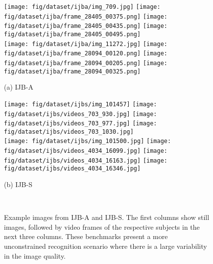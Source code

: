 \documentclass[10pt,twocolumn,letterpaper]{article}
\begin{document}
\begin{figure}
    \centering
    \footnotesize
    \captionsetup{font=footnotesize}
    \newcommand{\vshrink}{\vspace{-10px}}
    \begin{minipage}{0.48\linewidth}
    \texttt{[image: fig/dataset/ijba/img\_709.jpg]}\hfill
    \texttt{[image: fig/dataset/ijba/frame\_28405\_00375.png]}\hfill
    \texttt{[image: fig/dataset/ijba/frame\_28405\_00435.png]}\hfill
    \texttt{[image: fig/dataset/ijba/frame\_28405\_00495.png]}\\
    \texttt{[image: fig/dataset/ijba/img\_11272.jpg]}\hfill
    \texttt{[image: fig/dataset/ijba/frame\_28094\_00120.png]}\hfill
    \texttt{[image: fig/dataset/ijba/frame\_28094\_00205.png]}\hfill
    \texttt{[image: fig/dataset/ijba/frame\_28094\_00325.png]}
    \vspace{-2.0em}\begin{center}(a) IJB-A~\cite{IJBA}\end{center}
    \end{minipage}\hfill
    \begin{minipage}{0.48\linewidth}
    \texttt{[image: fig/dataset/ijbs/img\_101457]}\hfill
    \texttt{[image: fig/dataset/ijbs/videos\_703\_930.jpg]}\hfill
    \texttt{[image: fig/dataset/ijbs/videos\_703\_977.jpg]}\hfill
    \texttt{[image: fig/dataset/ijbs/videos\_703\_1030.jpg]}\\
    \texttt{[image: fig/dataset/ijbs/img\_101500.jpg]}\hfill
    \texttt{[image: fig/dataset/ijbs/videos\_4034\_16099.jpg]}\hfill
    \texttt{[image: fig/dataset/ijbs/videos\_4034\_16163.jpg]}\hfill
    \texttt{[image: fig/dataset/ijbs/videos\_4034\_16346.jpg]}
    \vspace{-2.0em}\begin{center}(b) IJB-S~\cite{IJBS}\end{center}
    \end{minipage}\\
    \vspace{-0.9em}\caption{Example images from IJB-A and IJB-S. The first columns show still images, followed by video frames of the respective subjects in the next three columns. These benchmarks present a more unconstrained recognition scenario where there is a large variability in the image quality.}\vspace{-1.6em}
    \label{fig:dataset}
\end{figure}
\end{document}

